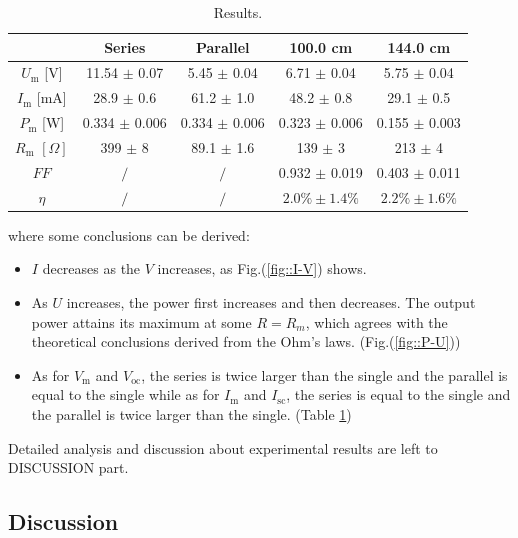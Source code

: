 \documentclass[a4paper]{article}
\begin{document}
\begin{table}[H]
	\centering
	\begin{tabular}{ccccc}
		\hline
		                         & Series            & Parallel          & 100.0 cm           & 144.0 cm          \\
		\hline
		$U_\text{m}$ [V]         & 11.54 $\pm$ 0.07  & 5.45 $\pm$ 0.04   & 6.71 $\pm$ 0.04    & 5.75 $\pm$ 0.04   \\
		$I_\text{m}$ [mA]        & 28.9 $\pm$ 0.6    & 61.2 $\pm$ 1.0    & 48.2 $\pm$ 0.8     & 29.1 $\pm$ 0.5    \\
		$P_\text{m}$ [W]         & 0.334 $\pm$ 0.006 & 0.334 $\pm$ 0.006 & 0.323 $\pm$ 0.006  & 0.155 $\pm$ 0.003 \\
		$R_\text{m}\,\,[\Omega]$ & 399 $\pm$ 8       & 89.1 $\pm$ 1.6    & 139 $\pm$ 3        & 213 $\pm$ 4       \\
		$FF$                     & $\slash$          & $\slash$          & 0.932 $\pm$ 0.019  & 0.403 $\pm$ 0.011 \\
		$\eta$                   & $\slash$          & $\slash$          & $2.0\% \pm 1.4 \%$ & $2.2\% \pm 1.6\%$ \\
		\hline
	\end{tabular}
	\caption{Results.}
	\label{table::result}
\end{table}

where some conclusions can be derived:
\begin{itemize}
	\item $I$ decreases as the $V$ increases, as Fig.(\ref{fig::I-V}) shows.
	\item As $U$ increases, the power first increases and then decreases. The output power attains its maximum at some $R = R_m$, which agrees with the theoretical conclusions derived from the Ohm’s laws. (Fig.(\ref{fig::P-U}))
	\item As for $V_\text{m}$ and $V_\text{oc}$, the series is twice larger than the single and the parallel is equal to the single while as for $I_\text{m}$ and $I_\text{sc}$, the series is equal to the single and the parallel is twice larger than the single. (Table \ref{table::result})
\end{itemize}

Detailed analysis and discussion about experimental results are left to DISCUSSION part.

\subsection{Discussion}
\end{document}

